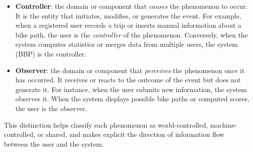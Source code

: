 \begin{itemize}
    \item \textbf{Controller}: the domain or component that \textit{causes} the phenomenon to occur. 
    It is the entity that initiates, modifies, or generates the event. 
    For example, when a registered user records a trip or inserts manual information about a bike path, 
    the user is the \textit{controller} of the phenomenon. 
    Conversely, when the system computes statistics or merges data from multiple users, the system (BBP) is the controller.

    \item \textbf{Observer}: the domain or component that \textit{perceives} the phenomenon once it has occurred. 
    It receives or reacts to the outcome of the event but does not generate it. 
    For instance, when the user submits new information, the system observes it. 
    When the system displays possible bike paths or computed scores, the user is the observer.
\end{itemize}

This distinction helps classify each phenomenon as world-controlled, machine-controlled, or shared, 
and makes explicit the direction of information flow between the user and the system.

\pagebreak

